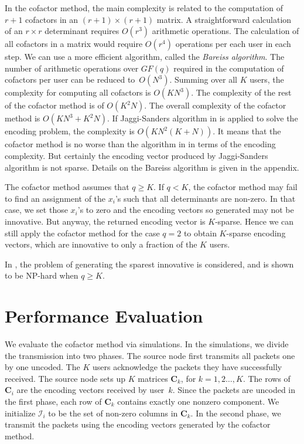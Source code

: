 \documentclass[letterpaper,conference,10pt]{IEEEtran}
\begin{document}
In the cofactor method, the main complexity is related to the computation of $r+1$ cofactors in an $(r+1) \times (r+1)$ matrix. A straightforward calculation of an $r\times r$ determinant requires $O(r^3)$ arithmetic operations. The calculation of all cofactors in a matrix would require $O(r^4)$ operations per each user in each step. We can use a more efficient algorithm, called the {\em Bareiss algorithm}. The number of arithmetic operations over $GF(q)$ required in the computation of cofactors per user can be reduced to~$O(N^3)$. Summing over all $K$ users, the complexity for computing all cofactors is $O(KN^3)$. The complexity of the rest of the cofactor method is of $O(K^2N)$. The overall complexity of the cofactor method is $O(KN^3+K^2N)$. If Jaggi-Sanders algorithm in \cite{JSCEEJT} is applied to solve the encoding problem, the complexity is $O(K N^2 (K+N))$. It means that the cofactor method is no worse than the algorithm in \cite{JSCEEJT} in terms of the encoding complexity. But certainly the encoding vector produced by Jaggi-Sanders algorithm is not sparse. Details on the Bareiss algorithm is given in the appendix.

The cofactor method assumes that $q\geq K$. If $q < K$, the cofactor method may fail to find an assignment of the $x_i$'s such that all determinants are non-zero. In that case, we set those $x_i$'s to zero and the encoding vectors so generated may not be innovative. But anyway, the returned encoding vector is  $K$-sparse. Hence we can still apply the cofactor method for the case $q=2$ to obtain $K$-sparse encoding vectors, which are innovative to only a fraction of the $K$ users.



In \cite{SSK11}, the problem of generating the sparest innovative is considered, and is shown to be NP-hard when $q\geq K$.

\section{Performance Evaluation} \label{sec:PE}

We evaluate the cofactor method via simulations. In the simulations, we divide the transmission into two phases. The source node first transmits all packets one by one uncoded. The $K$ users acknowledge the packets they have successfully received. The source node sets up $K$ matrices $\mathbf{C}_k$, for $k=1,2\ldots, K$. The rows of $\mathbf{C}_i$ are the encoding vectors received by user~$k$. Since the packets are uncoded in the first phase, each row of $\mathbf{C}_k$ contains exactly one nonzero component. We initialize $\mathcal{I}_i$ to be the set of non-zero columns in $\mathbf{C}_k$.  In the second phase, we transmit the packets using the encoding vectors generated by the cofactor method.
\end{document}
